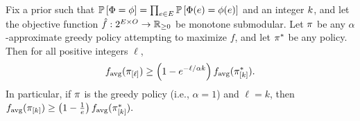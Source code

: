 \begin{theorem}  \label{thm:WINE}
Fix a prior such that 
$\mathbb{P}\left[{\color{black}{\ensuremath{\Phi}}} = {\color{black}{\ensuremath{\phi}}}\right] =\prod_{e \in E}\mathbb{P}\left[{\color{black}{\ensuremath{\Phi}}}(e) = {\color{black}{\ensuremath{\phi}}}(e)\right] $
and an integer $k$,
and let the objective function 
$\hat{f}:2^{E\times O} \to \mathbb{R}_{\ge 0}$ 
be monotone submodular.  
Let $\pi$ be any $\alpha$-approximate greedy policy attempting to maximize $f$, 
and let $\pi^*$ be any policy.  Then 
for all positive
integers $\ell$,
\[
f_{\text{avg}}( \pi_{[{\ell}]} ) \ge  \left( {1 - e^{-\ell/\alpha k}} \right) 
f_{\text{avg}}( \pi^*_{[{k}]} ) 
\mbox{.}
\]
In particular, if $\pi$ is the greedy policy (i.e., $\alpha = 1$) and $\ell = k$, then
$f_{\text{avg}}( \pi_{[{k}]} ) \ge  \left( {1 - \frac{1}{e}} \right)  f_{\text{avg}}( \pi^*_{[{k}]} ).$%
\end{theorem}

